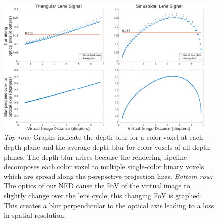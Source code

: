 \begin{figure}[tb!]
\centering
\includegraphics[width=\columnwidth]{images/volumetric/blur_graphs}
\caption[Volumetric NED: longitudinal and lateral blur of voxels at each depth plane]{\emph{Top row: }Graphs indicate the depth blur for a color voxel at each depth plane and the average depth blur for color voxels of all depth planes. The depth blur arises because the rendering pipeline decomposes each color voxel to multiple single-color binary voxels which are spread along the perspective projection lines. \emph{Bottom row: } The optics of our NED cause the FoV of the virtual image to slightly change over the lens cycle; this changing FoV is graphed. This creates a blur perpendicular to the optical axis leading to a loss in spatial resolution.}
\label{fig:volumetric:blur_graphs}
\end{figure}

